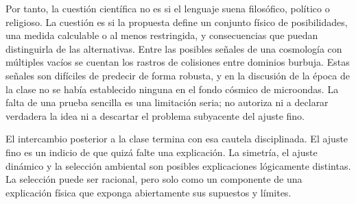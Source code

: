 Por tanto, la cuestión científica no es si el lenguaje suena filosófico, político o religioso. La cuestión es si la propuesta define un conjunto físico de posibilidades, una medida calculable o al menos restringida, y consecuencias que puedan distinguirla de las alternativas. Entre las posibles señales de una cosmología con múltiples vacíos se cuentan los rastros de colisiones entre dominios burbuja. Estas señales son difíciles de predecir de forma robusta, y en la discusión de la época de la clase no se había establecido ninguna en el fondo cósmico de microondas. La falta de una prueba sencilla es una limitación seria; no autoriza ni a declarar verdadera la idea ni a descartar el problema subyacente del ajuste fino.

\begin{classroomqa}
\end{classroomqa}

El intercambio posterior a la clase termina con esa cautela disciplinada. El ajuste fino es un indicio de que quizá falte una explicación. La simetría, el ajuste dinámico y la selección ambiental son posibles explicaciones lógicamente distintas. La selección puede ser racional, pero solo como un componente de una explicación física que exponga abiertamente sus supuestos y límites.
